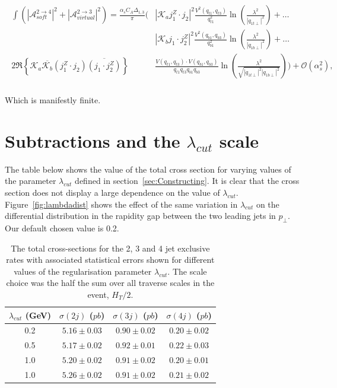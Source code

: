 	\begin{align}
	\begin{split}
		\int\left(|\mathcal{A}^{2\rightarrow4}_{soft}|^2 + |\mathcal{A}^{2\rightarrow3}_{virtual}|^2\right) =
		\frac{\alpha_sC_A\Delta_{1,3}}{\pi}\Bigg(&|\mathcal{K}_aj_1^Z\cdot j_2|^2 \frac{V^2(q_{t1},
		q_{t3})}{q_{t1}^2}\ln\left(\frac{\lambda^2}{|q_{1t\perp}|^2}\right)+\ldots \\
		& |\mathcal{K}_bj_1\cdot j_2^Z|^2 \frac{V^2(q_{b1}, q_{b3})}{q_{b1}^2}\ln
		\left(\frac{\lambda^2}{|q_{1b\perp}|^2}\right)+\ldots \\
		2\Re\left\{\mathcal{K}_a\overline{\mathcal{K}_b}  (j_1^Z\cdot j_2)\overline{(j_1\cdot j_2^Z)}\right\}
		&\frac{V(q_{t1}, q_{t3})\cdot V(q_{b1}, q_{b3})}{q_{t1}q_{t3}q_{b1}q_{b3}}\ln
		\left(\frac{\lambda^2}{\sqrt{|q_{1t\perp}|^2|q_{1b\perp}|^2}}\right)\Bigg) + \mathcal{O}(\alpha_s^2),\\
	\end{split}
	\end{align}

	Which is manifestly finite.

\section{Subtractions and the $\lambda_{cut}$ scale}
	\label{sec:indep-lambd}

	The table below shows the value of the total cross section for varying values of
	the parameter $\lambda_{cut}$ defined in section~\ref{sec:Constructing}.  It is
	clear that the cross section does not display a large dependence on the value of $\lambda_{cut}$.
	Figure~\ref{fig:lambdadist} shows the effect of the same variation in $\lambda_{cut}$ on the
	differential distribution in the rapidity gap between the two leading jets in $p_\perp$.
	Our default chosen value is 0.2.

	\begin{table}[htp!]
	\begin{center}
		\begin{tabular}{| c | c | c | c |}
		\hline
		$\lambda_{cut}$ (GeV) & $\sigma(2j)$ ($pb$) & $\sigma(3j)$ ($pb$) & $\sigma(4j)$ ($pb$) \\ \hline
		0.2 & $5.16 \pm 0.03$ & $0.90 \pm 0.02$ & $0.20 \pm 0.02$ \\
		0.5 & $5.17 \pm 0.02$ & $0.92 \pm 0.01$ & $0.22 \pm 0.03$ \\
		1.0 & $5.20 \pm 0.02$ & $0.91 \pm 0.02$ & $0.20 \pm 0.01$ \\
		1.0 & $5.26 \pm 0.02$ & $0.91 \pm 0.02$ & $0.21 \pm 0.02$ \\ \hline
		\end{tabular}
		\caption{The total cross-sections for the 2, 3 and 4 jet exclusive rates with associated
		         statistical errors shown for different values of the regularisation parameter $\lambda_{cut}$.
		         The scale choice was the half the sum over all traverse scales in the event, $H_T/2$.}
	\end{center}
	\end{table}

